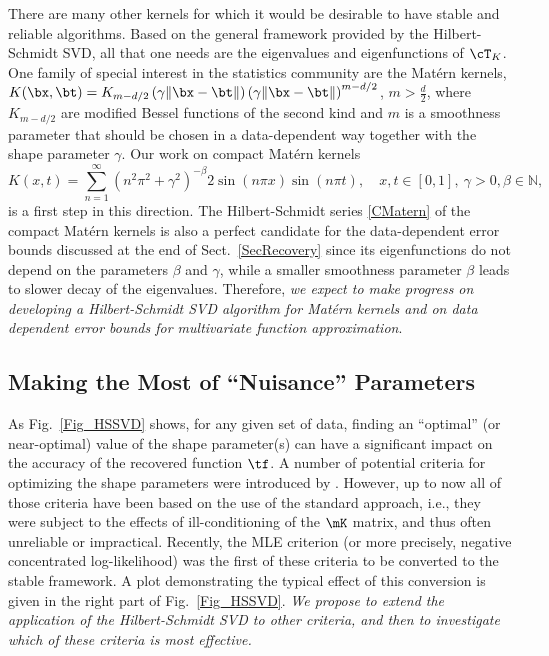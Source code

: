 There are many other kernels for which it would be desirable to have stable and reliable algorithms. Based on the general framework provided by the Hilbert-Schmidt SVD, all that one needs are the eigenvalues and eigenfunctions of $\cT_K$. One family of special interest in the statistics community \citep{Ste99} are the Mat\'ern kernels, $K(\bx,\bt) = K_{m-d/2}\left(\gamma\|\bx-\bt\|\right) \left( \gamma \| \bx - \bt \|\right)^{m-d/2}$, $m > \frac d2$,
where $K_{m-d/2}$ are modified Bessel functions of the second kind and $m$ is a smoothness parameter that should be chosen in a data-dependent way together with the shape parameter $\gamma$. Our work on compact Mat\'ern kernels \citep{CFMcC13}
\begin{equation}\label{CMatern}
K(x,t) = \sum_{n=1}^{\infty} \left(n^2\pi^2 + \gamma^2\right)^{-\beta} 2\sin(n\pi x) \sin(n\pi t), \quad x,t \in [0,1],\ \gamma>0, \beta \in \mathbb{N},
\end{equation}
is a first step in this direction. The Hilbert-Schmidt series \eqref{CMatern} of the compact Mat\'ern kernels is also a perfect candidate for the data-dependent error bounds discussed at the end of Sect.~\ref{SecRecovery} since its eigenfunctions do not depend on the parameters $\beta$ and $\gamma$, while a smaller smoothness parameter $\beta$ leads to slower decay of the eigenvalues. Therefore, \emph{we expect to make progress on developing a Hilbert-Schmidt SVD algorithm for Mat\'ern kernels and on data dependent error bounds for multivariate function approximation}.


\subsection{Making the Most of ``Nuisance'' Parameters}
As Fig.~\ref{Fig_HSSVD} shows, for any given set of data, finding an ``optimal'' (or near-optimal) value of the shape parameter(s) can have a significant impact on the accuracy of the recovered function $\tf$. A number of potential criteria for optimizing the shape parameters were introduced by \cite{Fasshauer11}. However, up to now all of those criteria have been based on the use of the standard approach, i.e., they were subject to the effects of ill-conditioning of the $\mK$ matrix, and thus often unreliable or impractical. Recently, the MLE criterion (or more precisely, negative concentrated log-likelihood) was the first of these criteria to be converted to the stable framework. A plot demonstrating the typical effect of this conversion is given in the right part of Fig.~\ref{Fig_HSSVD}. \emph{We propose to extend the application of the Hilbert-Schmidt SVD to other criteria, and then to investigate which of these criteria is most effective.}

